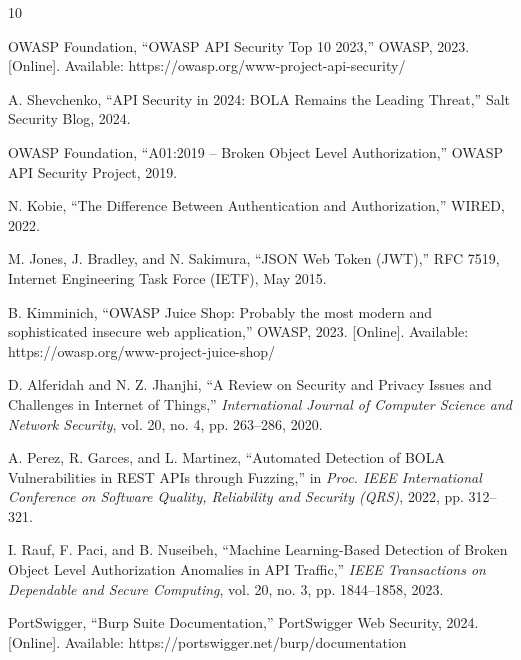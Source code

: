 \documentclass[12pt]{IEEEtran}
\begin{document}
\begin{thebibliography}{10}

OWASP Foundation, ``OWASP API Security Top 10 2023,'' OWASP, 2023. [Online]. Available: https://owasp.org/www-project-api-security/

A. Shevchenko, ``API Security in 2024: BOLA Remains the Leading Threat,'' Salt Security Blog, 2024.

OWASP Foundation, ``A01:2019 -- Broken Object Level Authorization,'' OWASP API Security Project, 2019.

N. Kobie, ``The Difference Between Authentication and Authorization,'' WIRED, 2022.

M. Jones, J. Bradley, and N. Sakimura, ``JSON Web Token (JWT),'' RFC 7519, Internet Engineering Task Force (IETF), May 2015.

B. Kimminich, ``OWASP Juice Shop: Probably the most modern and sophisticated insecure web application,'' OWASP, 2023. [Online]. Available: https://owasp.org/www-project-juice-shop/

D. Alferidah and N. Z. Jhanjhi, ``A Review on Security and Privacy Issues and Challenges in Internet of Things,'' \textit{International Journal of Computer Science and Network Security}, vol. 20, no. 4, pp. 263--286, 2020.

A. Perez, R. Garces, and L. Martinez, ``Automated Detection of BOLA Vulnerabilities in REST APIs through Fuzzing,'' in \textit{Proc. IEEE International Conference on Software Quality, Reliability and Security (QRS)}, 2022, pp. 312--321.

I. Rauf, F. Paci, and B. Nuseibeh, ``Machine Learning-Based Detection of Broken Object Level Authorization Anomalies in API Traffic,'' \textit{IEEE Transactions on Dependable and Secure Computing}, vol. 20, no. 3, pp. 1844--1858, 2023.

PortSwigger, ``Burp Suite Documentation,'' PortSwigger Web Security, 2024. [Online]. Available: https://portswigger.net/burp/documentation

\end{thebibliography}
\end{document}
